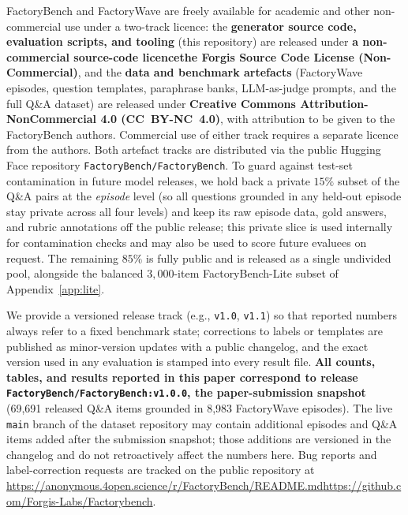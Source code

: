 FactoryBench and FactoryWave are freely available for academic and other non-commercial use under a two-track licence: the \textbf{generator source code, evaluation scripts, and tooling} (this repository) are released under \ifanon\textbf{a non-commercial source-code licence}\else\textbf{the Forgis Source Code License (Non-Commercial)}\fi, and the \textbf{data and benchmark artefacts} (FactoryWave episodes, question templates, paraphrase banks, LLM-as-judge prompts, and the full Q\&A dataset) are released under \textbf{Creative Commons Attribution-NonCommercial 4.0 (CC~BY-NC~4.0)}, with attribution to be given to the FactoryBench authors. Commercial use of either track requires a separate licence from the authors. Both artefact tracks are distributed via the public Hugging Face repository \texttt{FactoryBench/FactoryBench}. To guard against test-set contamination in future model releases, we hold back a private $15\%$ subset of the Q\&A pairs at the \emph{episode} level (so all questions grounded in any held-out episode stay private across all four levels) and keep its raw episode data, gold answers, and rubric annotations off the public release; this private slice is used internally for contamination checks and may also be used to score future evaluees on request. The remaining $85\%$ is fully public and is released as a single undivided pool, alongside the balanced $3{,}000$-item FactoryBench-Lite subset of Appendix~\ref{app:lite}.

We provide a versioned release track (e.g., \texttt{v1.0}, \texttt{v1.1}) so that reported numbers always refer to a fixed benchmark state; corrections to labels or templates are published as minor-version updates with a public changelog, and the exact version used in any evaluation is stamped into every result file. \textbf{All counts, tables, and results reported in this paper correspond to release} \texttt{\textbf{FactoryBench/FactoryBench:v1.0.0}}\textbf{, the paper-submission snapshot} (69{,}691 released Q\&A items grounded in 8{,}983 FactoryWave episodes). The live \texttt{main} branch of the dataset repository may contain additional episodes and Q\&A items added after the submission snapshot; those additions are versioned in the changelog and do not retroactively affect the numbers here. Bug reports and label-correction requests are tracked on the public repository at \ifanon\url{https://anonymous.4open.science/r/FactoryBench/README.md}\else\url{https://github.com/Forgis-Labs/Factorybench}\fi.

